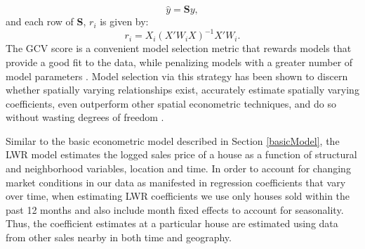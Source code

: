 \documentclass{article}\usepackage{graphicx, color}
\begin{document}
                   \begin{equation*}
                   \hat{y}=\textbf{S}y,
                   \end{equation*}
                   and each row of \textbf{S}, $r_i$ is given by:
                     \begin{equation*}
                   r_i=X_i(X'W_iX)^{-1}X'W_i.
                   \end{equation*}
The GCV score is a convenient model selection metric that rewards models that provide a good fit to the data, while penalizing models with a greater number of model parameters \citep{Loader1999, McMillen2010}. Model selection via this strategy has been shown to discern whether spatially varying relationships exist, accurately estimate spatially varying coefficients, even outperform other spatial econometric techniques, and do so without wasting degrees of freedom \citep{Paez2011, McMillen2010, McMillen2012}. 

Similar to the basic econometric model described in Section \ref{basicModel}, the LWR model estimates the logged sales price of a house as a function of structural and neighborhood variables, location and time. In order to account for changing market conditions in our data as manifested in regression coefficients that vary over time, when estimating LWR coefficients we use only houses sold within the past 12 months and also include month fixed effects to account for seasonality. Thus, the coefficient estimates at a particular house are estimated using data from other sales nearby in both time and geography.
\end{document}
